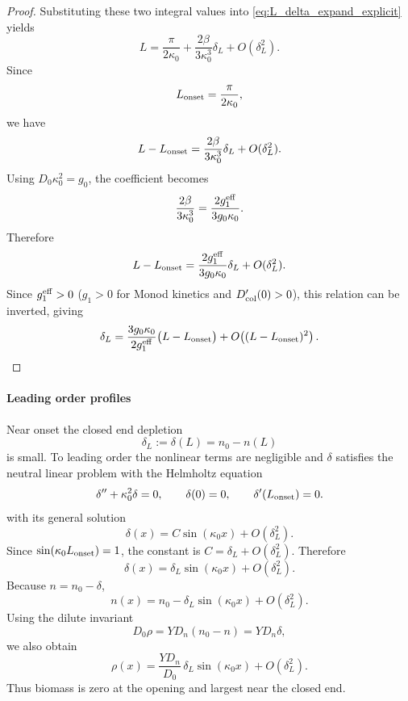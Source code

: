 \documentclass[11pt,a4paper]{report}
\begin{document}
\begin{proof}
		Substituting these two integral values into
		\eqref{eq:L_delta_expand_explicit} yields
		\begin{equation}
			L
			=
			\frac{\pi}{2\kappa_0}
			+
			\frac{2\beta}{3\kappa_0^3}\delta_L
			+
			O(\delta_L^2).
			\label{eq:L_delta_final_expand_explicit}
		\end{equation}
		Since
		\[
		L_{\rm onset}=\frac{\pi}{2\kappa_0},
		\]
		we have
		\begin{equation}
			L-L_{\rm onset}
			=
			\frac{2\beta}{3\kappa_0^3}\delta_L
			+
			O(\delta_L^2).
			\label{eq:L_minus_Lonset_delta}
		\end{equation}
		Using $D_0\kappa_0^2=g_0$, the coefficient becomes
		\[
		\frac{2\beta}{3\kappa_0^3}
		=
		\frac{2g_1^{\rm eff}}{3g_0\kappa_0}.
		\]
		Therefore
		\begin{equation}
			L-L_{\rm onset}
			=
			\frac{2g_1^{\rm eff}}{3g_0\kappa_0}\delta_L
			+
			O(\delta_L^2).
		\end{equation}
		Since $g_1^{\rm eff}>0$ ($g_1>0$ for Monod kinetics and $D_{\rm col}'(0)>0$), this relation can be inverted, giving
		\begin{equation}
			{
				\delta_L
				=
				\frac{3g_0\kappa_0}{2g_1^{\mathrm{eff}}}
				\bigl(L-L_{\rm onset}\bigr)
				+
				O\!\left((L-L_{\rm onset})^2\right).
			}
		\end{equation}
	\end{proof}
	\paragraph{Leading order profiles}
	Near onset the closed end depletion
	\[
	\delta_L:=\delta(L)=n_0-n(L)
	\]
	is small. To leading order the nonlinear terms are negligible and
	$\delta$ satisfies the neutral linear problem with the Helmholtz equation
	\[
	\delta''+\kappa_0^2\delta=0,
	\qquad
	\delta(0)=0,
	\qquad
	\delta'(L_{\rm onset})=0.
	\]
	with its general solution
	\[
	\delta(x)=C\sin(\kappa_0 x)+O(\delta_L^2).
	\]
	Since $\sin(\kappa_0 L_{\rm onset})=1$, the constant is
	$C=\delta_L+O(\delta_L^2)$.  Therefore
	\begin{equation}
		{
			\delta(x)
			=
			\delta_L\sin(\kappa_0 x)
			+
			O(\delta_L^2).
		}
		\label{eq:delta_profile_near_onset}
	\end{equation}
	Because $n=n_0-\delta$,
	\begin{equation}
		{
			n(x)
			=
			n_0-\delta_L\sin(\kappa_0 x)
			+
			O(\delta_L^2).
		}
		\label{eq:n_profile_near_onset_corrected}
	\end{equation}
	Using the dilute invariant
	\[
	D_0\rho=YD_n(n_0-n)=YD_n\delta,
	\]
	we also obtain
	\begin{equation}
		{
			\rho(x)
			=
			\frac{YD_n}{D_0}\,
			\delta_L\sin(\kappa_0 x)
			+
			O(\delta_L^2).
		}
		\label{eq:rho_profile_near_onset_corrected}
	\end{equation}
	Thus biomass is zero at the opening and largest near the closed end.
	
\end{document}
